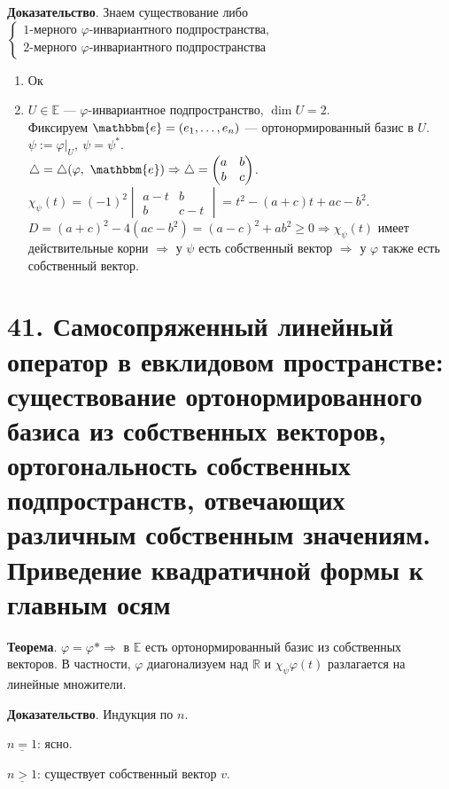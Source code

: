 \documentclass[a4paper, 12pt]{article}
\newcommand{\E}{\mathbb{E}}
\newcommand{\R}{\mathbb{R}}
\newcommand{\me}{\mathbbm{e}}
\begin{document}
\textbf{Доказательство}.
Знаем существование либо $\begin{cases*}
\text{1-мерного $\varphi$-инвариантного подпространства}, \\
\text{2-мерного $\varphi$-инвариантного подпространства}
\end{cases*}$
\vspace{-3mm}
\begin{enumerate}
    \itemsep=0em
    \item Ок
    \item $U \in \E$ --- $\varphi$-инвариантное подпространство, $\dim U = 2$. \\
    Фиксируем $\me = (e_1, \ldots, e_n)$ --- ортонормированный базис в $U$. \\
    $\psi := \varphi|_U,\ \psi = \psi^*$. \\
    $\triangle = \triangle(\varphi,\ \me) \Rightarrow \triangle = \begin{pmatrix}
    a & b \\
    b & c
    \end{pmatrix}$. \\
    $\chi_\psi(t) = (-1)^2\begin{vmatrix}
    a - t & b \\
    b & c - t
    \end{vmatrix} = t^2 - (a + c)t + ac - b^2$. \\
    $D = (a + c)^2 - 4(ac - b^2) = (a - c)^2 + ab^2 \geqslant 0 \Rightarrow \chi_\psi(t)$ имеет действительные корни $\Rightarrow$ у $\psi$ есть собственный вектор $\Rightarrow$ у $\varphi$ также есть собственный вектор.
\end{enumerate}

\section*{41. Самосопряженный линейный оператор в евклидовом пространстве: существование ортонормированного базиса из собственных векторов, ортогональность собственных подпространств, отвечающих различным собственным значениям. Приведение квадратичной формы к главным осям}
\textbf{Теорема}. $\varphi = \varphi* \Rightarrow$ в $\E$ есть ортонормированный базис из собственных векторов. В частности, $\varphi$ диагонализуем над $\R$ и $\chi_\psi\varphi(t)$ разлагается на линейные множители.

\textbf{Доказательство}. Индукция по $n$.

$\underline{n = 1}$: ясно.

$\underline{n > 1}$: существует собственный вектор $v$.
\end{document}
